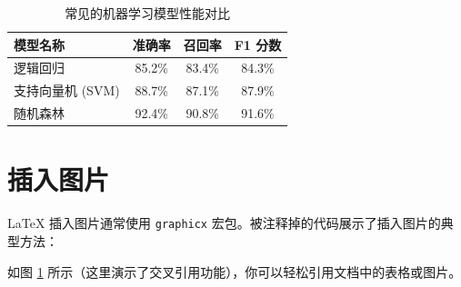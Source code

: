 \documentclass[12pt,a4paper]{article}
\begin{document}
\begin{table}[htbp]
    \centering
    \caption{常见的机器学习模型性能对比}
    \label{tab:models}
    \begin{tabular}{lccc}
        \toprule
        \textbf{模型名称} & \textbf{准确率} & \textbf{召回率} & \textbf{F1 分数} \\
        \midrule
        逻辑回归 & 85.2\% & 83.4\% & 84.3\% \\
        支持向量机 (SVM) & 88.7\% & 87.1\% & 87.9\% \\
        随机森林 & 92.4\% & 90.8\% & 91.6\% \\
        \bottomrule
    \end{tabular}
\end{table}

\section{插入图片}
\LaTeX{} 插入图片通常使用 \texttt{graphicx} 宏包。被注释掉的代码展示了插入图片的典型方法：


如图 \ref{tab:models} 所示（这里演示了交叉引用功能），你可以轻松引用文档中的表格或图片。
\end{document}
